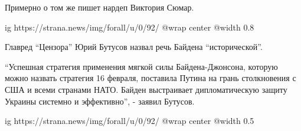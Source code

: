 Примерно о том же пишет нардеп Виктория Сюмар.

\ifcmt
  ig https://strana.news/img/forall/u/0/92/%
  @wrap center
  @width 0.8
\fi

Главред \enquote{Цензора} Юрий Бутусов назвал речь Байдена \enquote{исторической}.

\enquote{Успешная стратегия применения мягкой силы Байдена-Джонсона, которую можно
назвать стратегия 16 февраля, поставила Путина на грань столкновения с США и
всеми странами НАТО. Байден выстраивает дипломатическую защиту Украины системно
и эффективно}, - заявил Бутусов.

\ifcmt
  ig https://strana.news/img/forall/u/0/92/%
  @wrap center
  @width 0.5
\fi
